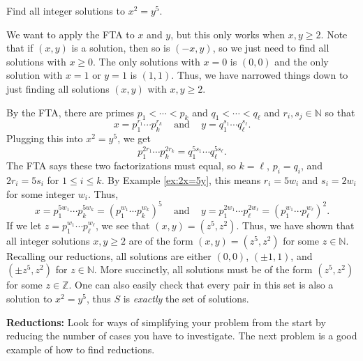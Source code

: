 \documentclass[11pt,dvipsnames]{book}
\numberwithin{figure}{section} %
\numberwithin{table}{section} %
\begin{document}
\begin{exercise}
Find all integer solutions to $x^{2}=y^{5}$. \\

\begin{solution}
We want to apply the FTA to $x$ and $y$, but this only works when $x,y\geq 2$. Note that if $(x,y)$ is a solution, then so is $(-x,y)$, so we just need to find all solutions with $x\geq 0$. The only solutions with $x=0$ is $(0,0)$ and the only solution with $x=1$ or $y=1$ is $(1,1)$. Thus, we have narrowed things down to just finding all solutions $(x,y)$ with $x,y\geq 2$.

By the FTA, there are primes $p_{1}<\cdots <p_{k}$ and $q_{1}<\cdots <q_{\ell}$ and $r_{i},s_{j}\in \mathbb{N}$ so that
\[
x=p_{1}^{r_{1}}\cdots p_{k}^{r_{k}}\;\;\; \mbox{ and } \;\;\; y= q_1^{s_{1}}\cdots q_\ell^{s_{\ell}}.\]
Plugging this into $x^2=y^5$, we get
\[
p_{1}^{2r_{1}}\cdots p_{k}^{2r_{k}} = q_1^{5s_{1}}\cdots q_\ell^{5s_{\ell}}.
\]
The FTA says these two factorizations must equal, so $k=\ell$, $p_i=q_i$, and $2r_{i}=5s_{i}$ for $1\leq i\leq k$. By Example \ref{ex:2x=5y}, this means $r_{i}=5w_{i}$ and $s_{i}=2w_{i}$ for some integer $w_{i}$. Thus,
\[
x=p_{1}^{5w_{1}}\cdots p_{k}^{5w_{k}}= \left(p_{1}^{w_{1}}\cdots p_{k}^{w_{k}}\right)^{5} \;\;\; \mbox{ and } \;\;\;
y
=p_1^{2w_{1}}\cdots p_\ell^{2w_{\ell}} = \left(p_1^{w_{1}}\cdots p_\ell^{w_{\ell}}\right)^2.
\]
If we let $z=p_1^{w_{1}}\cdots p_\ell^{w_{\ell}}$, we see that $(x,y)=(z^{5},z^{2})$. Thus, we have shown that all integer solutions $x,y\geq 2$ are of the form $(x,y)=(z^{5},z^{2})$ for some $z\in\mathbb{N}$. Recalling our reductions, all solutions are either $(0,0)$, $(\pm 1,1)$, and $(\pm z^5,z^2)$ for $z\in\mathbb{N}$. More succinctly, all solutions must be of the form $( z^5,z^2)$ for some $z\in\mathbb{Z}$. One can also easily check that every pair in this set is also a solution to $x^2=y^5$, thus $S$ is {\it exactly} the set of solutions.
\end{solution}
\end{exercise}

\begin{protip}
{\bf Reductions:} Look for ways of simplifying your problem from the start by reducing the number of cases you have to investigate. The next problem is a good example of how to find reductions.
\end{protip}
\end{document}
